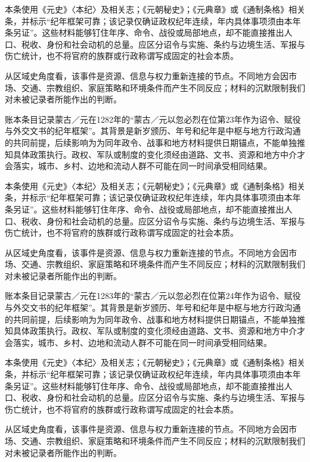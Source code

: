本条使用《元史》〈本纪〉及相关志；《元朝秘史》；《元典章》或《通制条格》相关条，并标示“纪年框架可靠；该记录仅确证政权纪年连续，年内具体事项须由本年条另证”。这些材料能够钉住年序、命令、战役或局部地点，却不能直接推出人口、税收、身份和社会动机的总量。应区分诏令与实施、条约与边境生活、军报与伤亡统计，也不将官府的族群或行政称谓写成固定的社会本质。

从区域史角度看，该事件是资源、信息与权力重新连接的节点。不同地方会因市场、交通、宗教组织、家庭策略和环境条件而产生不同反应；材料的沉默限制我们对未被记录者所能作出的判断。

账本条目记录蒙古／元在1282年的“蒙古／元以忽必烈在位第23年作为诏令、赋役与外交文书的纪年框架”。其背景是新岁颁历、年号和纪年是中枢与地方行政沟通的共同前提，后续影响为为同年政令、战事和地方材料提供日期锚点，不能单独推知具体政策执行。政权、军队或制度的变化须经由道路、文书、资源和地方中介才会落实，城市、乡村、边地和流动人群不可能在同一时间承受相同结果。

本条使用《元史》〈本纪〉及相关志；《元朝秘史》；《元典章》或《通制条格》相关条，并标示“纪年框架可靠；该记录仅确证政权纪年连续，年内具体事项须由本年条另证”。这些材料能够钉住年序、命令、战役或局部地点，却不能直接推出人口、税收、身份和社会动机的总量。应区分诏令与实施、条约与边境生活、军报与伤亡统计，也不将官府的族群或行政称谓写成固定的社会本质。

从区域史角度看，该事件是资源、信息与权力重新连接的节点。不同地方会因市场、交通、宗教组织、家庭策略和环境条件而产生不同反应；材料的沉默限制我们对未被记录者所能作出的判断。

账本条目记录蒙古／元在1283年的“蒙古／元以忽必烈在位第24年作为诏令、赋役与外交文书的纪年框架”。其背景是新岁颁历、年号和纪年是中枢与地方行政沟通的共同前提，后续影响为为同年政令、战事和地方材料提供日期锚点，不能单独推知具体政策执行。政权、军队或制度的变化须经由道路、文书、资源和地方中介才会落实，城市、乡村、边地和流动人群不可能在同一时间承受相同结果。

本条使用《元史》〈本纪〉及相关志；《元朝秘史》；《元典章》或《通制条格》相关条，并标示“纪年框架可靠；该记录仅确证政权纪年连续，年内具体事项须由本年条另证”。这些材料能够钉住年序、命令、战役或局部地点，却不能直接推出人口、税收、身份和社会动机的总量。应区分诏令与实施、条约与边境生活、军报与伤亡统计，也不将官府的族群或行政称谓写成固定的社会本质。

从区域史角度看，该事件是资源、信息与权力重新连接的节点。不同地方会因市场、交通、宗教组织、家庭策略和环境条件而产生不同反应；材料的沉默限制我们对未被记录者所能作出的判断。

